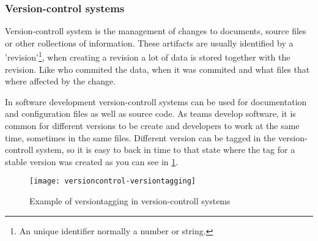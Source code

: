 \subsubsection{Version-control systems}
Version-controll system is the management of changes to documents, source files or other collections of information. These artifacts are usually identified by a 'revision'\footnote{An unique identifier normally a number or string.}, when creating a revision a lot of data is stored together with the revision. Like who commited the data, when it was commited and what files that where affected by the change.

In software development version-controll systems can be used for documentation and configuration files as well as source code. As teams develop software, it is common for different versions to be create and developers to work at the same time, sometimes in the same files. Different version can be tagged in the version-controll system, so it is easy to back in time to that state where the tag for a stable version was created as you can see in \ref{versiontagging}.

\begin{figure}[!htpb]
\centering
	\texttt{[image: versioncontrol-versiontagging]}
\caption{Example of versiontagging in version-controll systems}
\label{versiontagging}
\end{figure}





